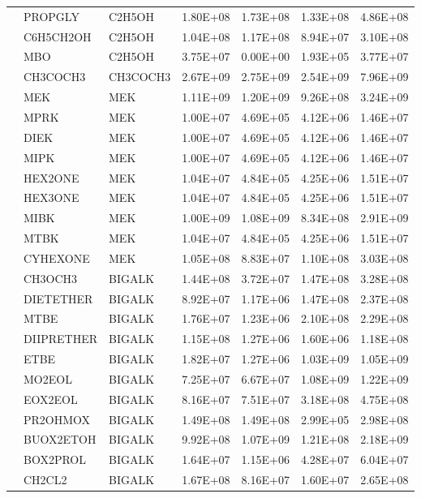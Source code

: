 \begin{longtable}{lllllll}
	 & PROPGLY & C2H5OH & 1.80E+08 & 1.73E+08 & 1.33E+08 & 4.86E+08 \\
	 & C6H5CH2OH & C2H5OH & 1.04E+08 & 1.17E+08 & 8.94E+07 & 3.10E+08 \\
	 & MBO & C2H5OH & 3.75E+07 & 0.00E+00 & 1.93E+05 & 3.77E+07 \\
	\hline \parbox[t]{2mm}{} & CH3COCH3 & CH3COCH3 & 2.67E+09 & 2.75E+09 & 2.54E+09 & 7.96E+09 \\
	 & MEK & MEK & 1.11E+09 & 1.20E+09 & 9.26E+08 & 3.24E+09 \\
	 & MPRK & MEK & 1.00E+07 & 4.69E+05 & 4.12E+06 & 1.46E+07 \\
	 & DIEK & MEK & 1.00E+07 & 4.69E+05 & 4.12E+06 & 1.46E+07 \\
	 & MIPK & MEK & 1.00E+07 & 4.69E+05 & 4.12E+06 & 1.46E+07 \\
	 & HEX2ONE & MEK & 1.04E+07 & 4.84E+05 & 4.25E+06 & 1.51E+07 \\
	 & HEX3ONE & MEK & 1.04E+07 & 4.84E+05 & 4.25E+06 & 1.51E+07 \\
	 & MIBK & MEK & 1.00E+09 & 1.08E+09 & 8.34E+08 & 2.91E+09 \\
	 & MTBK & MEK & 1.04E+07 & 4.84E+05 & 4.25E+06 & 1.51E+07 \\
	 & CYHEXONE & MEK & 1.05E+08 & 8.83E+07 & 1.10E+08 & 3.03E+08 \\
	\hline \parbox[t]{2mm}{} & CH3OCH3 & BIGALK & 1.44E+08 & 3.72E+07 & 1.47E+08 & 3.28E+08 \\*
	 & DIETETHER & BIGALK & 8.92E+07 & 1.17E+06 & 1.47E+08 & 2.37E+08 \\*
	 & MTBE & BIGALK & 1.76E+07 & 1.23E+06 & 2.10E+08 & 2.29E+08 \\
	 & DIIPRETHER & BIGALK & 1.15E+08 & 1.27E+06 & 1.60E+06 & 1.18E+08 \\
	 & ETBE & BIGALK & 1.82E+07 & 1.27E+06 & 1.03E+09 & 1.05E+09 \\
	 & MO2EOL & BIGALK & 7.25E+07 & 6.67E+07 & 1.08E+09 & 1.22E+09 \\
	 & EOX2EOL & BIGALK & 8.16E+07 & 7.51E+07 & 3.18E+08 & 4.75E+08 \\
	 & PR2OHMOX & BIGALK & 1.49E+08 & 1.49E+08 & 2.99E+05 & 2.98E+08 \\
	 & BUOX2ETOH & BIGALK & 9.92E+08 & 1.07E+09 & 1.21E+08 & 2.18E+09 \\
	 & BOX2PROL & BIGALK & 1.64E+07 & 1.15E+06 & 4.28E+07 & 6.04E+07 \\
	\hline \parbox[t]{2mm}{} & CH2CL2 & BIGALK & 1.67E+08 & 8.16E+07 & 1.60E+07 & 2.65E+08 \\

\end{longtable}
